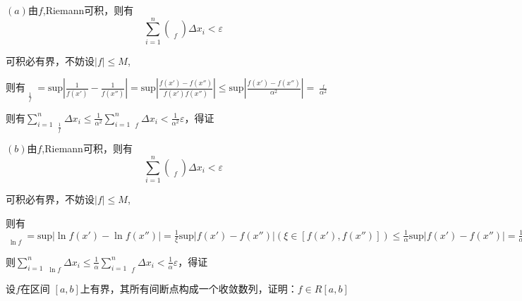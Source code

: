 \documentclass[lang=cn,10pt]{elegantbook}
\begin{document}
\begin{solution}
	
	$(a)$由$f$,Riemann可积，则有
	\begin{equation*}
		\sum_{i=1}^n{\left( \mathop {w_i} \limits_{f} \right) \varDelta x_i<\varepsilon}
	\end{equation*}
	
	可积必有界，不妨设$|f|\le M$,
	
	则有$ \mathop {\omega _i} \limits_{\frac{1}{f}}=\mathrm{sup}|\frac{1}{f\left( x\prime \right)}-\frac{1}{f\left( x'' \right)}|=\mathrm{sup}|\frac{f\left( x\prime \right) -f\left( x'' \right)}{f\left( x\prime \right) f\left( x'' \right)}|\le \mathrm{sup}|\frac{f\left( x\prime \right) -f\left( x'' \right)}{\alpha ^2}|=\frac{\mathop {\omega _i} \limits_{f}}{\alpha ^2}
	$
	
	则有$\sum_{i=1}^n{\mathop {\omega _i} \limits_{\frac{1}{f}}\varDelta x_i}\le \frac{1}{\alpha ^2}\sum_{i=1}^n{\mathop {\omega _i} \limits_{f}\varDelta x_i<\frac{1}{\alpha ^2}}\varepsilon 
	$，得证
	
	$(b)$由$f$,Riemann可积，则有
	\begin{equation*}
		\sum_{i=1}^n{\left( \mathop {w_i} \limits_{f} \right) \varDelta x_i<\varepsilon}
	\end{equation*}
	
	可积必有界，不妨设$|f|\le M$,
	
	则有$\mathop {\omega _i} \limits_{\ln f}=\mathrm{sup}|\ln f\left( x\prime \right) -\ln f\left( x'' \right) |=\frac{1}{\xi}\mathrm{sup}|f\left( x\prime \right) -f\left( x'' \right) |\left( \xi \in \left[ f\left( x\prime \right) ,f\left( x'' \right) \right] \right) \le \frac{1}{\alpha}\mathrm{sup}|f\left( x\prime \right) -f\left( x'' \right) |=\frac{1}{\alpha}\mathop {\omega _i} \limits_{f}
	$
	
	则$\sum_{i=1}^n{\mathop {\omega _i} \limits_{\ln f}\varDelta x_i}\le \frac{1}{\alpha}\sum_{i=1}^n{\mathop {\omega _i} \limits_{f}\varDelta x_i<\frac{1}{\alpha}}\varepsilon 
	$，得证
\end{solution}
\begin{example}
	设$f$在区间 $[a,b]$上有界，其所有间断点构成一个收敛数列，证明：$f\in R[a,b]$
\end{example}
\end{document}
